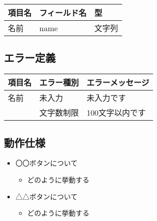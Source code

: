 \documentclass[letterpaper,10pt,dvipdfmx]{sphinxmanual}
\begin{document}


\begin{savenotes}\sphinxattablestart
\centering
\begin{tabulary}{\linewidth}[t]{|T|T|T|}
\hline
\sphinxstyletheadfamily 
項目名
&\sphinxstyletheadfamily 
フィールド名
&\sphinxstyletheadfamily 
型
\\
\hline
名前
&
name
&
文字列
\\
\hline
\end{tabulary}
\par
\sphinxattableend\end{savenotes}


\subsection{エラー定義}
\label{\detokenize{footer:id4}}

\begin{savenotes}\sphinxattablestart
\centering
\begin{tabulary}{\linewidth}[t]{|T|T|T|}
\hline
\sphinxstyletheadfamily 
項目名
&\sphinxstyletheadfamily 
エラー種別
&\sphinxstyletheadfamily 
エラーメッセージ
\\
\hline
名前
&
未入力
&
未入力です
\\
\hline&
文字数制限
&
100文字以内です
\\
\hline
\end{tabulary}
\par
\sphinxattableend\end{savenotes}


\subsection{動作仕様}
\label{\detokenize{footer:id5}}\begin{itemize}
\item {} 
〇〇ボタンについて
\begin{itemize}
\item {} 
どのように挙動する

\end{itemize}

\item {} 
△△ボタンについて
\begin{itemize}
\item {} 
どのように挙動する

\end{itemize}

\end{itemize}
\end{document}
